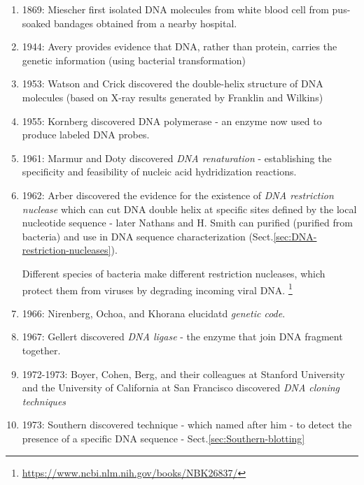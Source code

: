 \begin{enumerate}
  \item 1869: Miescher first isolated DNA molecules from white blood cell from
  pus-soaked bandages obtained from a nearby hospital.
  
  \item 1944: Avery provides evidence that DNA, rather than protein, carries the
  genetic information (using bacterial transformation)
  
  \item 1953: Watson and Crick discovered the double-helix structure of DNA
  molecules (based on X-ray results generated by Franklin and Wilkins)
  
  \item 1955: Kornberg discovered DNA polymerase - an enzyme now used to produce
  labeled DNA probes.
  
  \item 1961: Marmur and Doty discovered {\it DNA renaturation} - establishing
  the specificity and feasibility of nucleic acid hydridization reactions.
  
  \item 1962: Arber discovered the evidence for the existence of {\it  DNA
  restriction nuclease} which can cut DNA double helix at specific sites defined
  by the local nucleotide sequence - later Nathans and H.
  Smith can purified (purified from bacteria) and use in DNA sequence
  characterization (Sect.\ref{sec:DNA-restriction-nucleases}).
  
Different species of bacteria make different restriction nucleases, which
protect them from viruses by degrading incoming viral DNA.
\footnote{\url{https://www.ncbi.nlm.nih.gov/books/NBK26837/}}

  
  \item 1966: Nirenberg, Ochoa, and Khorana elucidatd {\it genetic code}. 
  
  \item 1967: Gellert discovered {\it DNA ligase} - the enzyme that join DNA
  fragment together.
  
  \item 1972-1973:  Boyer, Cohen, Berg, and their colleagues at Stanford
  University and the University of California at San Francisco discovered {\it
  DNA cloning techniques}
  
  \item 1973: Southern discovered technique - which named after him - to detect
  the presence of a specific DNA sequence - Sect.\ref{sec:Southern-blotting}
  

\end{enumerate}
